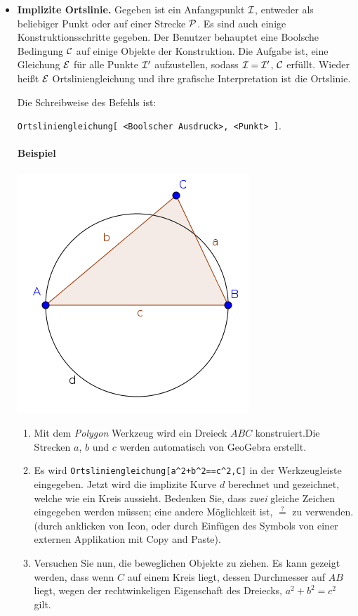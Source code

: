 \documentclass{article}
\begin{document}
\begin{itemize}
\item \textbf{Implizite Ortslinie.}
Gegeben ist ein Anfangspunkt $\cal I$, entweder als beliebiger Punkt oder auf einer Strecke $\cal P$. Es sind auch einige Konstruktionsschritte gegeben. Der Benutzer behauptet eine Boolsche Bedingung $\cal C$ auf einige Objekte der Konstruktion. Die Aufgabe ist, eine Gleichung $\cal E$ für alle Punkte $\cal{I}'$ aufzustellen, sodass $\cal{I}=\cal{I}'$,  $\cal{C}$ erfüllt. Wieder heißt  $\cal{E}$ Ortsliniengleichung und ihre grafische Interpretation ist die Ortslinie.

Die Schreibweise des Befehls ist:
\begin{center}
    \texttt{Ortsliniengleichung[ <Boolscher Ausdruck>, <Punkt> ]}.
\end{center}


\paragraph{Beispiel}
\begin{center}
\includegraphics[scale=0.5]{LocusEquation-example-implicit}
\end{center}
\begin{enumerate}
    \item Mit dem \textit{Polygon} Werkzeug wird ein Dreieck $ABC$ konstruiert.Die Strecken $a$, $b$ und $c$ werden automatisch von GeoGebra erstellt.
    \item Es wird \texttt{Ortsliniengleichung[a\^{}2+b\^{}2==c\^{}2,C]} in der Werkzeugleiste eingegeben. Jetzt wird die implizite Kurve $d$ berechnet und gezeichnet, welche wie ein Kreis aussieht.
    Bedenken Sie, dass \textit{zwei} gleiche Zeichen eingegeben werden müssen; eine andere Möglichkeit ist, $\stackrel{?}{=}$ zu verwenden. (durch anklicken von \framebox{$\alpha$} Icon, oder durch Einfügen des Symbols von einer externen Applikation mit Copy and Paste).
    \item Versuchen Sie nun, die beweglichen Objekte zu ziehen. Es kann gezeigt werden, dass wenn $C$ auf einem Kreis liegt, dessen Durchmesser auf $AB$ liegt, wegen der rechtwinkeligen Eigenschaft des Dreiecks, $a^2+b^2=c^2$ gilt.
\end{enumerate}

\end{itemize}
\end{document}
